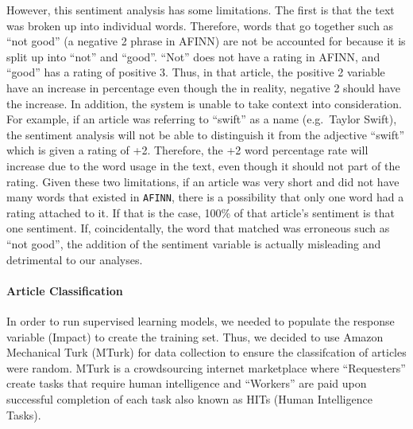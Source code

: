 \documentclass[10pt,letterpaper]{article}
\begin{document}
However, this sentiment analysis has some limitations. The first is that
the text was broken up into individual words. Therefore, words that go
together such as ``not good'' (a negative 2 phrase in AFINN) are not be
accounted for because it is split up into ``not'' and ``good''. ``Not''
does not have a rating in AFINN, and ``good'' has a rating of positive
3. Thus, in that article, the positive 2 variable have an increase in
percentage even though the in reality, negative 2 should have the
increase. In addition, the system is unable to take context into
consideration. For example, if an article was referring to ``swift'' as
a name (e.g.~Taylor Swift), the sentiment analysis will not be able to
distinguish it from the adjective ``swift'' which is given a rating of
+2. Therefore, the +2 word percentage rate will increase due to the word
usage in the text, even though it should not part of the rating. Given
these two limitations, if an article was very short and did not have
many words that existed in \texttt{AFINN}, there is a possibility that
only one word had a rating attached to it. If that is the case, 100\% of
that article's sentiment is that one sentiment. If, coincidentally, the
word that matched was erroneous such as ``not good'', the addition of
the sentiment variable is actually misleading and detrimental to our
analyses.

\hypertarget{article-classification}{%
\paragraph{Article Classification}\label{article-classification}}

In order to run supervised learning models, we needed to populate the
response variable (Impact) to create the training set. Thus, we decided
to use Amazon Mechanical Turk (MTurk) for data collection to ensure the
classifcation of articles were random. MTurk is a crowdsourcing internet
marketplace where ``Requesters'' create tasks that require human
intelligence and ``Workers'' are paid upon successful completion of each
task also known as HITs (Human Intelligence Tasks).
\end{document}
